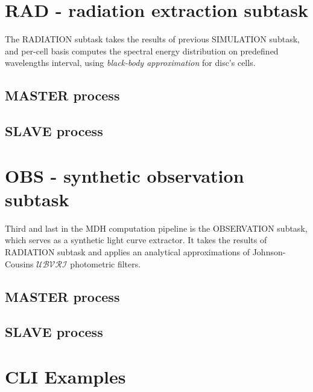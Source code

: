 \section{RAD - radiation extraction subtask}
    The RADIATION subtask takes the results of previous SIMULATION subtask, and per-cell basis computes the spectral energy distribution on predefined wavelengths interval, using \emph{black-body approximation} for disc's cells. 

\subsection{MASTER process}
\subsection{SLAVE process}

\section{OBS - synthetic observation subtask}
    Third and last in the MDH computation pipeline is the OBSERVATION subtask, which serves as a synthetic light curve extractor. It takes the results of RADIATION subtask and applies an analytical approximations of Johnson-Cousins $\mathcal{UBVRI}$ photometric filters. 

\subsection{MASTER process}
\subsection{SLAVE process}

\section{CLI Examples}
